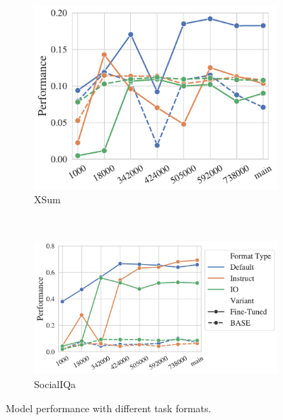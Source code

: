\begin{figure}[t!]
    \begin{subfigure}[b]{0.4\textwidth}
    \includegraphics[width=\the\columnwidth]{figures/fig_files/task_format/task_format_evalxsum-trainxsum.pdf}
        \caption{XSum}
    \end{subfigure}%
    ~ 
    \begin{subfigure}[b]{0.55\textwidth}
    \includegraphics[width=\the\columnwidth]{figures/fig_files/task_format/task_format_evalsocialiqa-trainsocialiqa.pdf}
        \caption{SocialIQa}
    \end{subfigure}%

    \caption {Model performance with different task formats. }
  \label{fig:app:task_format}
\end{figure}